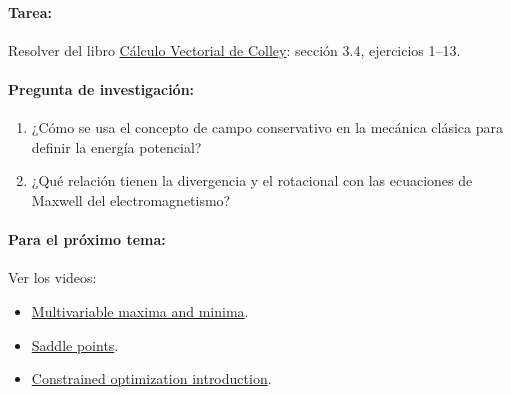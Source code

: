 \documentclass[a4,11pt]{aleph-notas}
\begin{document}
\paragraph{Tarea:}
Resolver del libro \href{https://catalogobiblioteca.puce.edu.ec/cgi-bin/koha/opac-detail.pl?biblionumber=83405&query_desc=su%3A%22An%C3%A1lisis%20vectorial%22}{Cálculo Vectorial de Colley}: sección 3.4, ejercicios 1--13.

\paragraph{Pregunta de investigación:}
\begin{enumerate}[leftmargin=*]
    \item ¿Cómo se usa el concepto de campo conservativo en la mecánica clásica para definir la energía potencial?
    \item ¿Qué relación tienen la divergencia y el rotacional con las ecuaciones de Maxwell del electromagnetismo?
\end{enumerate}

\paragraph{Para el próximo tema:}
Ver los videos:
\begin{itemize}[leftmargin=*]
    \item \href{https://youtu.be/ux7EQ3ip2DU?si=lG-a2LZMwXjNJT6N}{Multivariable maxima and minima}.
    \item \href{https://youtu.be/8aAU4r_pUUU?si=Xlqsv6h_FrTwnLFp}{Saddle points}.
    \item \href{https://youtu.be/vwUV2IDLP8Q?si=SLtsA2HiDLrlH4nY}{Constrained optimization introduction}.
\end{itemize}
\end{document}

